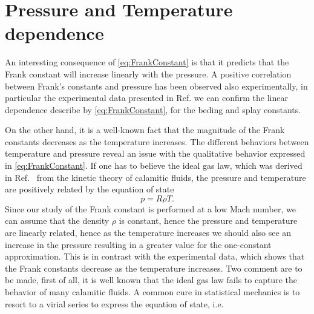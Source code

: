 \documentclass[%
 aip,
 amsmath,amssymb,
 reprint,%
]{revtex4-1}
\begin{document}
\section{Pressure and Temperature dependence}
An interesting consequence of \eqref{eq:FrankConstant} is that it predicts that the Frank constant will increase linearly with the pressure. A positive correlation between Frank's constants and pressure has been observed also experimentally\cite{SBF87}, in particular the experimental data presented in Ref. \cite{PRPH12} we can confirm the linear dependence describe by \eqref{eq:FrankConstant}, for the beding and splay constants.

On the other hand, it is a well-known fact that the magnitude of the Frank constants decreases as the temperature increases\cite{dGJ,G73}.
The different behaviors between temperature and pressure reveal an issue with the qualitative behavior expressed in \eqref{eq:FrankConstant}.
If one has to believe the ideal gas law, which was derived in Ref.~ from the kinetic theory of calamitic fluids, the pressure and temperature are positively related by the equation of state
\begin{equation}
  p = R \rho T. 
\end{equation}
Since our study of the Frank constant is performed at a low Mach number, we can assume that the density $\rho$ is constant, hence the pressure and temperature are linearly related, hence as the temperature increases we should also see an increase in the pressure resulting in a greater value for the one-constant approximation.
This is in contrast with the experimental data, which shows that the Frank constants decrease as the temperature increases.
Two comment are to be made, first of all, it is well known that the ideal gas law fails to capture the behavior of many calamitic fluids\cite{YV78}. A common cure in statistical mechanics is to resort to a virial series to express the equation of state, i.e.

\end{document}
